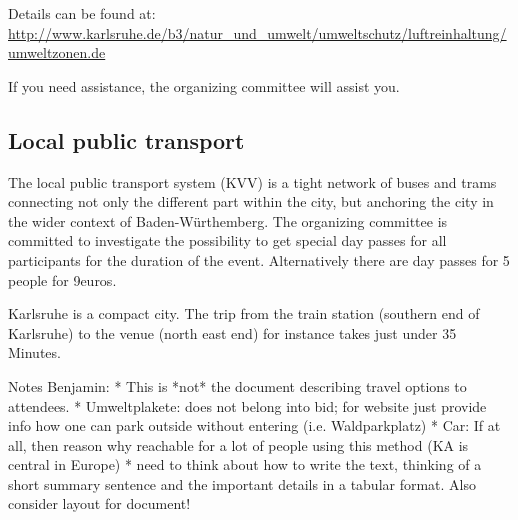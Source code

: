 Details can be found at:
\url{http://www.karlsruhe.de/b3/natur_und_umwelt/umweltschutz/luftreinhaltung/umweltzonen.de}

If you need assistance, the organizing committee will assist you.

\subsection{Local public transport}



The local public transport system (KVV) is a tight network of buses and trams connecting not only the different part within the city, but anchoring the city in the wider context of Baden-Würthemberg. The organizing committee is committed to investigate the possibility to get special day passes for all participants for the duration of the event. Alternatively there are day passes for 5 people for 9euros.

Karlsruhe is a compact city. The trip from the train station (southern end of Karlsruhe) to the venue (north east end) for instance takes just under 35 Minutes.



Notes Benjamin:
 * This is *not* the document describing travel options to attendees.
 * Umweltplakete: does not belong into bid; for website just provide info how one can park outside without entering (i.e. Waldparkplatz)
 * Car: If at all, then reason why reachable for a lot of people using this method (KA is central in Europe)
 * need to think about how to write the text, thinking of a short summary sentence and the important details in a tabular format. Also consider layout for document!
